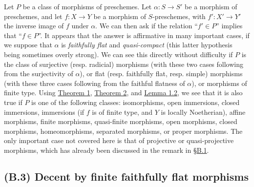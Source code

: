 \documentclass{article}
\newcommand{\oldpage}[1]{\marginpar{\footnotesize$\Big\vert$ \textit{p.~#1}}}
\theoremstyle{definition}
\theoremstyle{definition}
\theoremstyle{definition}
\theoremstyle{definition}
\theoremstyle{remark}
\begin{document}
Let \(P\) be a class of morphisms of preschemes.
Let \(\alpha\colon S\to S'\) be a morphism of preschemes, and let \(f\colon X\to Y\) be a morphism of \(S\)-preschemes, with \(f'\colon X'\to Y'\) the inverse image of \(f\) under \(\alpha\).
We can then ask if the relation ``\(f'\in P\)'' implies that ``\(f\in P\)''.
It appears that the answer is affirmative in many important cases, if we suppose that \(\alpha\) is \emph{faithfully flat} and \emph{quasi-compact} (this latter hypothesis being sometimes overly strong).
We can see this directly without difficulty if \(P\) is the class of surjective (resp. radicial) morphisms (with these two cases following from the surjectivity of \(\alpha\)), or flat (resp. faithfully flat, resp. simple) morphisms (with these three cases following from the faithful flatness of \(\alpha\)), or morphisms of finite type.
Using \protect\hyperlink{fga-3-i-section-B.1-theorem-1}{Theorem 1}, \protect\hyperlink{fga-3-i-section-B.1-theorem-2}{Theorem 2}, and \protect\hyperlink{fga-3-i-section-B.1-lemma-1.2}{Lemma 1.2}, we see that it is also true if \(P\) is one of the following classes:
isomorphisms, open immersions, closed immersions, immersions (if \(f\) is of finite type, and \(Y\) is locally Noetherian), affine morphisms, finite morphisms, quasi-finite morphisms, open morphisms, closed morphisms, homeomorphisms, separated morphisms, or proper morphisms.
\oldpage{190-21}The only important case not covered here is that of projective or quasi-projective morphisms, which has already been discussed in the remark in \protect\hyperlink{fga-3-i-section-B.1}{§B.1}.

\hypertarget{fga-3-i-section-B.3}{%
\subsection{(B.3) Decent by finite faithfully flat morphisms}\label{fga-3-i-section-B.3}}
\end{document}
